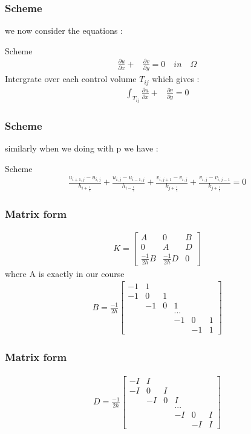 \documentclass[11pt]{beamer}
\numberwithin{equation}{section}
\theoremstyle{plain}
\theoremstyle{definition}
\theoremstyle{remark}
\begin{document}
\begin{frame}\frametitle{Scheme}
 we now consider the equations :
\begin{block}{Scheme}
\begin{align*}
 \frac{\partial u}{\partial x}+& \frac{\partial v}{\partial y} = 0 \quad in \quad \Omega 
\end{align*}   
Intergrate over each control volume $T_{ij}$ which gives : 
\begin{align*}
\int_{T_{ij}} \frac{\partial u}{\partial x}+& \frac{\partial v}{\partial y} = 0
\end{align*}   
\end{block}
\end{frame}
\begin{frame}\frametitle{Scheme}
similarly when we doing with p we have : 
\begin{block}{Scheme}
\begin{align*}
\frac{u_{i+1,j}-u_{i,j}}{h_{i+\frac{1}{2}}}+\frac{u_{i,j}-u_{i-1,j}}{h_{i-\frac{1}{2}}}+\frac{v_{i,j+1}-v_{i,j}}{k_{j+\frac{1}{2}}}+\frac{v_{i,j}-v_{i,j-1}}{k_{j+\frac{1}{2}}}=0
\end{align*}   
\end{block}
\end{frame}

\begin{frame}\frametitle{Matrix form}
\begin{align*}
K=\begin{bmatrix}
A & 0 & B\\ 
0 & A & D\\ 
\frac{-1}{2h} B & \frac{-1}{2h}D & 0 
\end{bmatrix}
\end{align*}  
where A is exactly in our course 
\begin{align*}
B=\frac{-1}{2h} \begin{bmatrix}
-1 & 1 &  &  &  & \\ 
-1 & 0 & 1 &  &  & \\ 
 & -1 & 0 & 1 &  & \\ 
 &  &  & ... &  & \\ 
 &  &  & -1 & 0 & 1\\ 
 &  &  &  & -1 & 1
\end{bmatrix}
\end{align*}
\end{frame}

\begin{frame}\frametitle{Matrix form}
\begin{align*}
D=\frac{-1}{2h} \begin{bmatrix}
-I & I &  &  &  & \\ 
-I & 0 & I &  &  & \\ 
 & -I & 0 & I &  & \\ 
 &  &  & ... &  & \\ 
 &  &  & -I & 0 & I\\ 
 &  &  &  & -I & I 
\end{bmatrix}
\end{align*} 
\end{frame}
\end{document}
